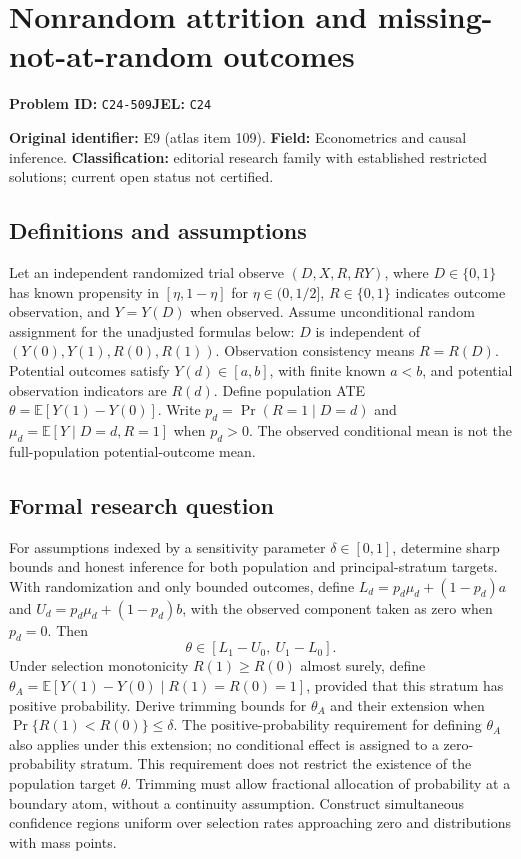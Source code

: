 \documentclass[11pt,a4paper]{article}
\begin{document}
\section*{Nonrandom attrition and missing-not-at-random outcomes}
\textbf{Problem ID:} \texttt{C24-509}\quad \textbf{JEL:} \texttt{C24}\par
\label{problem:OP-0109}
\label{atlas:prob:E9}

\noindent\textbf{Original identifier:} E9 (atlas item 109). \textbf{Field:} Econometrics and causal inference. \textbf{Classification:} editorial research family with established restricted solutions; current open status not certified.

\subsection*{Definitions and assumptions}

Let an independent randomized trial observe $(D,X,R,RY)$, where $D\in\{0,1\}$ has known propensity in $[\eta,1-\eta]$ for $\eta\in(0,1/2]$, $R\in\{0,1\}$ indicates outcome observation, and $Y=Y(D)$ when observed. Assume unconditional random assignment for the unadjusted formulas below: $D$ is independent of $(Y(0),Y(1),R(0),R(1))$. Observation consistency means $R=R(D)$. Potential outcomes satisfy $Y(d)\in[a,b]$, with finite known $a<b$, and potential observation indicators are $R(d)$. Define population ATE $\theta=\mathbb E[Y(1)-Y(0)]$. Write $p_d=\Pr(R=1\mid D=d)$ and $\mu_d=\mathbb E[Y\mid D=d,R=1]$ when $p_d>0$. The observed conditional mean is not the full-population potential-outcome mean.

\subsection*{Formal research question}

For assumptions indexed by a sensitivity parameter $\delta\in[0,1]$, determine sharp bounds and honest inference for both population and principal-stratum targets. With randomization and only bounded outcomes, define $L_d=p_d\mu_d+(1-p_d)a$ and $U_d=p_d\mu_d+(1-p_d)b$, with the observed component taken as zero when $p_d=0$. Then
\[
\theta\in[L_1-U_0,\ U_1-L_0].
\]
Under selection monotonicity $R(1)\ge R(0)$ almost surely, define $\theta_A=\mathbb E[Y(1)-Y(0)\mid R(1)=R(0)=1]$, provided that this stratum has positive probability. Derive trimming bounds for $\theta_A$ and their extension when $\Pr\{R(1)<R(0)\}\le\delta$. The positive-probability requirement for defining $\theta_A$ also applies under this extension; no conditional effect is assigned to a zero-probability stratum. This requirement does not restrict the existence of the population target $\theta$. Trimming must allow fractional allocation of probability at a boundary atom, without a continuity assumption. Construct simultaneous confidence regions uniform over selection rates approaching zero and distributions with mass points.
\end{document}

